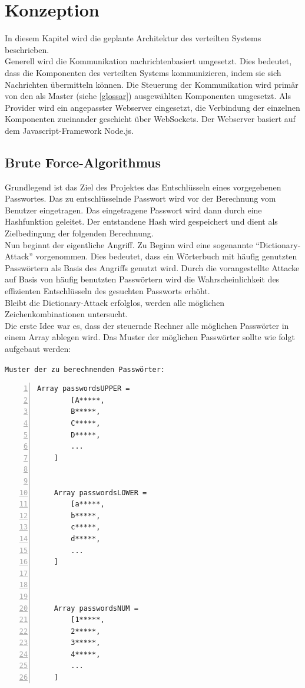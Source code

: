 \chapter{Konzeption}
\label{Konzeption}
In diesem Kapitel wird die geplante Architektur des verteilten Systems beschrieben. \\
Generell wird die Kommunikation nachrichtenbasiert umgesetzt. Dies bedeutet, dass die Komponenten des verteilten Systems kommunizieren, indem sie sich Nachrichten übermitteln können. Die Steuerung der Kommunikation wird primär von den als Master 
(siehe \ref{glossar}) ausgewählten Komponenten umgesetzt. Als Provider wird ein angepasster Webserver eingesetzt, die Verbindung der einzelnen Komponenten zueinander geschieht über WebSockets. Der Webserver basiert auf dem Javascript-Framework Node.js. \\


\section{Brute Force-Algorithmus}
\label{ideeBruteForce}
Grundlegend ist das Ziel des Projektes das Entschlüsseln eines vorgegebenen Passwortes. Das zu entschlüsselnde Passwort wird vor der Berechnung vom Benutzer eingetragen. Das eingetragene Passwort wird dann durch eine Hashfunktion geleitet. Der entstandene Hash wird gespeichert und dient als Zielbedingung der folgenden Berechnung. \\
Nun beginnt der eigentliche Angriff. Zu Beginn wird eine sogenannte \enquote{Dictionary-Attack} vorgenommen. Dies bedeutet, dass ein Wörterbuch mit häufig genutzten Passwörtern als Basis des Angriffs genutzt wird. Durch die vorangestellte Attacke auf Basis von häufig benutzten Passwörtern wird die Wahrscheinlichkeit des effizienten Entschlüsseln des gesuchten Passworts erhöht. \\
Bleibt die Dictionary-Attack erfolglos, werden alle möglichen Zeichenkombinationen untersucht. \\
Die erste Idee war es, dass der steuernde Rechner alle möglichen Passwörter in einem Array ablegen wird. Das Muster der möglichen Passwörter sollte wie folgt aufgebaut werden: 

\texttt{Muster der zu berechnenden Passwörter:}
\begin{lstlisting}[basicstyle=\ttfamily,numbers=left,numberstyle=\footnotesize\ttfamily,backgroundcolor=\color{sourcegray}]
	Array passwordsUPPER = 
		[A*****,
	 	B*****,
	 	C*****,
	 	D*****,
	 	...
	]
	
	
	Array passwordsLOWER = 
		[a*****,
	 	b*****,
	 	c*****,
	 	d*****,
		...
	]
	
	

	Array passwordsNUM = 
		[1*****,
	 	2*****,
	 	3*****,
	 	4*****,
		...
	]
\end{lstlisting}

